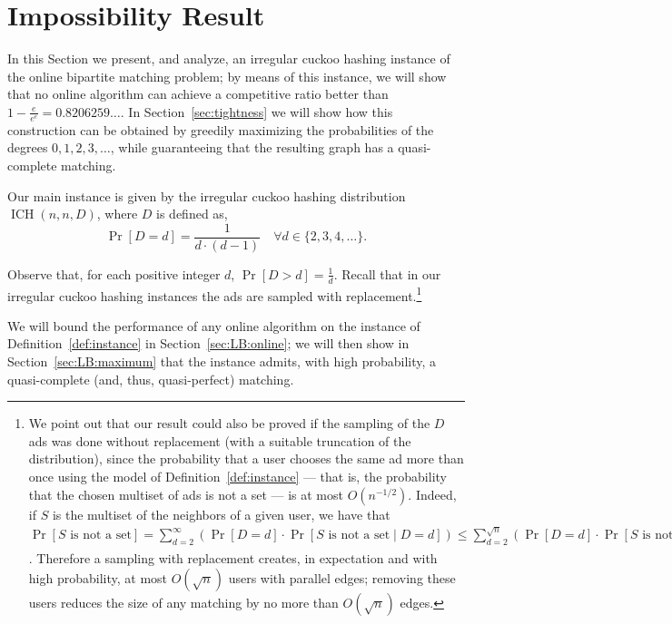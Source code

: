\documentclass[11pt]{article}
\DeclareMathOperator*{\irregularcuckoohashing}{ICH}
\begin{document}
\section{Impossibility Result}\label{sec:impossibility}
In this Section we present, and analyze, an irregular cuckoo hashing instance of the online bipartite matching problem; by means of this instance, we will show that no online algorithm can achieve a competitive ratio better than $1 - \frac e{e^e} = 0.8206259\ldots$.  In Section~\ref{sec:tightness} we will show how this construction can be obtained by greedily maximizing the probabilities of the degrees $0,1,2,3,\ldots$, while guaranteeing that the resulting graph has a quasi-complete matching.
\begin{definition}\label{def:instance}
Our main instance is given by the irregular cuckoo hashing distribution $\irregularcuckoohashing(n, n, D)$, where $D$ is defined as,
\[
\Pr[D = d] = \frac1{d \cdot (d-1)} \quad \forall d \in \{2,3,4,\ldots\}.
\]
\end{definition}
Observe that, for each positive integer $d$, $\Pr[D > d] = \frac1d$. Recall that in our irregular cuckoo hashing instances the ads are sampled with replacement.\footnote{We point out that our result could also be proved if the sampling of the $D$ ads was done without replacement (with a suitable truncation of the distribution), since the probability that a user chooses the same ad more than once using the model of Definition~\ref{def:instance} --- that is, the probability that the chosen multiset of ads is not a set --- is at most $O\left(n^{-1/2}\right)$.  Indeed, if $S$ is the multiset of the neighbors of a given user, we have that
$\Pr[S \text{ is not a set}] = \sum_{d=2}^{\infty} \left(\Pr[D = d] \cdot \Pr\left[S \text{ is not a set} \mid D = d\right]\right) \le  \sum_{d=2}^{\sqrt{n} } \left(\Pr[D = d] \cdot \Pr\left[S \text{ is not a set} \mid D = d\right]\right) + \sum_{d=\sqrt{n}+1}^{\infty} \Pr[D = d] \le \sum_{d=2}^{\sqrt{n}} \left(\frac1{d\cdot(d-1)} \cdot \binom{d}2 \cdot  \frac n{n^2}\right) + \Pr[D > \sqrt{n}] \le \frac{\sqrt{n}}{2n} + \frac1{\sqrt{n}} = \frac3{2\sqrt{n}}$. Therefore a sampling with replacement  creates, in expectation and with high probability, at most $O\left(\sqrt{n}\right)$ users with parallel edges; removing these users reduces the size of any matching by no more than $O(\sqrt{n})$ edges.}

\smallskip

We will bound the performance of any online algorithm on the instance of Definition~\ref{def:instance} in Section~\ref{sec:LB:online}; we will then show in Section~\ref{sec:LB:maximum} that the instance admits, with high probability, a quasi-complete (and, thus, quasi-perfect) matching.
\end{document}
